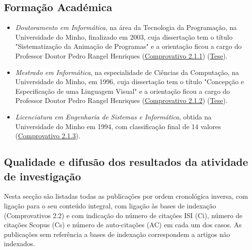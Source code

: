 \documentclass[11pt]{article}
\newcommand{\daterange}[1]{#1}
\begin{document}
\subsection{Formação Académica} 
\begin{itemize} 
\item{ {\em{{Doutoramento em Informática}}}, na área da Tecnologia da Programação, na Universidade do Minho, finalizado em \daterange{2003}, cuja dissertação tem o título "Sistematização da Animação de Programas" e a orientação ficou a cargo do Professor Doutor Pedro Rangel Henriques (\href{run:Diplomas/dout.pdf}{Comprovativo 2.1.1}) (\href{run:Publicacoes/publicacoes/8.pdf}{Tese}).}
\item{ {\em{{Mestrado em Informática}}}, na especialidade de Ciências da Computação, na Universidade do Minho, em \daterange{1996}, cuja dissertação tem o título "Concepção e Especificação de uma Linguagem Visual" e a orientação ficou a cargo do Professor Doutor Pedro Rangel Henriques (\href{run:Diplomas/mest.pdf}{Comprovativo 2.1.2}) (\href{run:Publicacoes/publicacoes/1.pdf}{Tese}).}
\item{ {\em{{Licenciatura em Engenharia de Sistemas e Informática}}}, obtida na Universidade do Minho em \daterange{1994}, com classificação final de 14 valores (\href{run:Diplomas/licenc.pdf}{Comprovativo 2.1.3}).}
\end{itemize}


\subsection{Qualidade e difusão dos resultados da atividade de investigação}

Nesta secção são listadas todas as publicações por ordem cronológica inversa, com ligação para o seu conteúdo integral, com ligação às bases de indexação (Comprovativos 2.2) e com indicação do número de citações ISI (Ci), número de citações Scopus (Cs) e número de auto-citações (AC) em cada um dos casos. As publicações sem referência a bases de indexação correspondem a artigos não indexados.
\end{document}
